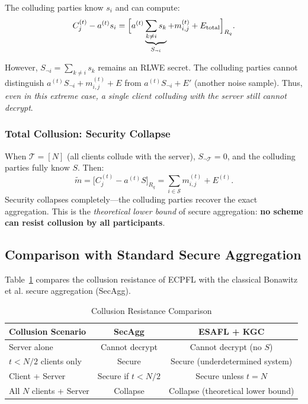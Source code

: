 The colluding parties know $s_i$ and can compute:
\begin{equation}
    C_j^{(t)} - a^{(t)} s_i = \Bigl[ a^{(t)} \underbrace{\sum_{k \neq i} s_k}_{S_{\neg i}} + m_{i,j}^{(t)} + E_{\mathrm{total}} \Bigr]_{R_q}.
\end{equation}

However, $S_{\neg i} = \sum_{k \neq i} s_k$ remains an RLWE secret. The colluding parties cannot distinguish $a^{(t)} S_{\neg i} + m_{i,j}^{(t)} + E$ from $a^{(t)} S_{\neg i} + E'$ (another noise sample). Thus, \emph{even in this extreme case, a single client colluding with the server still cannot decrypt}.

\subsubsection{Total Collusion: Security Collapse}

When $\mathcal{T} = [N]$ (all clients collude with the server), $S_{\neg\mathcal{T}} = 0$, and the colluding parties fully know $S$. Then:
\begin{equation}
    \tilde{m} = \bigl[ C_j^{(t)} - a^{(t)} S \bigr]_{R_q} = \sum_{i \in \mathcal{S}} m_{i,j}^{(t)} + E^{(t)}.
\end{equation}
Security collapses completely---the colluding parties recover the exact aggregation. This is the \emph{theoretical lower bound} of secure aggregation: \textbf{no scheme can resist collusion by all participants}.

\subsection{Comparison with Standard Secure Aggregation}
\label{ssec:comparison}

Table~\ref{tab:security-comparison} compares the collusion resistance of \textsc{ECPFL} with the classical Bonawitz et al. secure aggregation (SecAgg).

\begin{table}[htbp]
\centering
\caption{Collusion Resistance Comparison}
\label{tab:security-comparison}
\begin{tabular}{lcc}
\toprule
\textbf{Collusion Scenario} & \textbf{SecAgg} & \textbf{ESAFL + KGC} \\
\midrule
Server alone & Cannot decrypt & Cannot decrypt (no $S$) \\
$t < N/2$ clients only & Secure & Secure (underdetermined system) \\
Client + Server & Secure if $t < N/2$ & Secure unless $t = N$ \\
All $N$ clients + Server & Collapse & Collapse (theoretical lower bound) \\
\bottomrule
\end{tabular}
\end{table}

